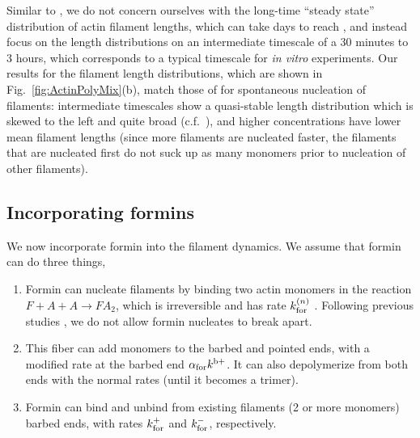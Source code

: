 \documentclass[11pt]{article}
\begin{document}
Similar to \cite{banerjee2022emergence}, we do not concern ourselves with the long-time ``steady state'' distribution of actin filament lengths, which can take days to reach \cite{hu2007theoretical, fass2008stochastic, mohapatra2017limiting}, and instead focus on the length distributions on an intermediate timescale of a 30 minutes to 3 hours, which corresponds to a typical timescale for \emph{in vitro} experiments. Our results for the filament length distributions, which are shown in Fig.\ \ref{fig:ActinPolyMix}(b), match those of \cite{banerjee2022emergence} for spontaneous nucleation of filaments: intermediate timescales show a quasi-stable length distribution which is skewed to the left and quite broad (c.f.\ \cite[Fig.~2c]{banerjee2022emergence}), and higher concentrations have lower mean filament lengths (since more filaments are nucleated faster, the filaments that are nucleated first do not suck up as many monomers prior to nucleation of other filaments). 

\subsection{Incorporating formins \label{sec:formin}}
We now incorporate formin into the filament dynamics. We assume that formin can do three things,
\begin{enumerate}
\item Formin can nucleate filaments by binding two actin monomers in the reaction $F+A+A \rightarrow FA_2$, which is irreversible and has rate $k_\text{for}^{(n)}$ \cite{paul2008role, zweifel2021nucleation}. Following previous studies \cite{paul2008role, zweifel2021nucleation}, we do not allow formin nucleates to break apart.
\item This fiber can add monomers to the barbed and pointed ends, with a modified rate at the barbed end $\alpha_\text{for} k^\text{b+}$. It can also depolymerize from both ends with the normal rates (until it becomes a trimer).
\item Formin can bind and unbind from existing filaments (2 or more monomers) barbed ends, with rates $k_\text{for}^+$ and $k_\text{for}^-$, respectively. 
\end{enumerate}
\end{document}
